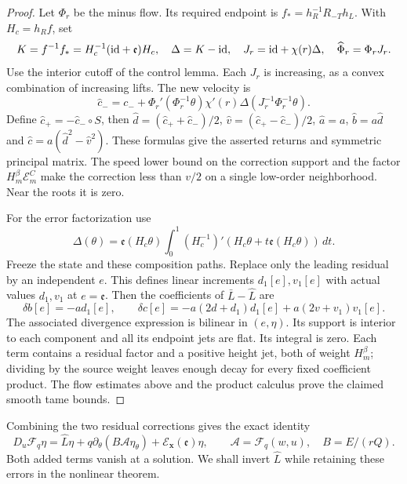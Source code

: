 \begin{proof}
Let $\Phi_r$ be the minus flow. Its required endpoint is
$f_*=h_R^{-1}R_{-T}h_L$. With $H_c=h_Rf$, set
\[
 K=f^{-1}f_*=H_c^{-1}(\mathrm{id}+\mathfrak e)H_c,
 \quad\Delta=K-\mathrm{id},\quad J_r=\mathrm{id}+\chi(r)\Delta,
 \quad\widehat\Phi_r=\Phi_rJ_r.
\]
Use the interior cutoff of the control lemma. Each $J_r$ is increasing,
as a convex combination of increasing lifts. The new velocity is
\begin{equation}\label{eq:readable-optical-velocity}
 \widehat c_-=c_-+
 \Phi_r'(\Phi_r^{-1}\theta)\chi'(r)
                   \Delta(J_r^{-1}\Phi_r^{-1}\theta).
\end{equation}
Define $\widehat c_+=-\widehat c_-\circ S$, then
$\widehat d=(\widehat c_++\widehat c_-)/2$,
$\widehat v=(\widehat c_+-\widehat c_-)/2$,
$\widehat a=a$, $\widehat b=a\widehat d$ and
$\widehat c=a(\widehat d^2-\widehat v^2)$.
These formulas give the asserted returns and symmetric principal matrix.
The speed lower bound on the correction support and the factor
$H_m^\beta\mathcal E_m^C$ make the correction less than $v/2$
on a single low-order neighborhood. Near the roots it is zero.

For the error factorization use
\[
 \Delta(\theta)=\mathfrak e(H_c\theta)
 \int_0^1(H_c^{-1})'(H_c\theta+t\mathfrak e(H_c\theta))\,dt.
\]
Freeze the state and these composition paths. Replace only the leading
residual by an independent $e$. This defines linear increments
$d_1[e],v_1[e]$ with actual values $d_1,v_1$ at $e=\mathfrak e$.
Then the coefficients of $\bar L-\widehat L$ are
\[
 \delta b[e]=-a d_1[e],\qquad
 \delta c[e]=-a(2d+d_1)d_1[e]+a(2v+v_1)v_1[e].
\]
The associated divergence expression is bilinear in $(e,\eta)$.
Its support is interior to each component and all its endpoint jets
are flat. Its integral is zero. Each term contains a residual factor
and a positive height jet, both of weight $H_m^\beta$; dividing by
the source weight leaves enough decay for every fixed coefficient
product. The flow estimates above and the product calculus prove the
claimed smooth tame bounds.
\end{proof}

Combining the two residual corrections gives the exact identity
\begin{equation}\label{eq:readable-completed-height-derivative}
 D_u\mathcal F_q\eta=\widehat L\eta
       +q\partial_\theta(B\mathcal A\eta_\theta)
       +\mathscr E_{\mathbf x}(\mathfrak e)\eta,
 \qquad \mathcal A=\mathcal F_q(w,u),\quad B=E/(rQ).
\end{equation}
Both added terms vanish at a solution. We shall invert $\widehat L$
while retaining these errors in the nonlinear theorem.

